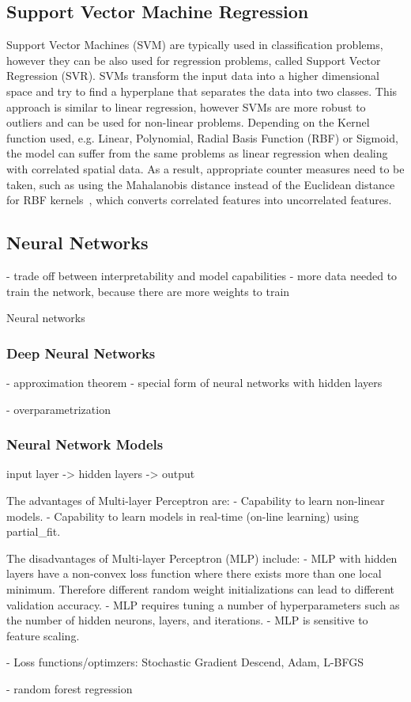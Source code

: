 \subsection{Support Vector Machine Regression}

Support Vector Machines (SVM) are typically used in classification problems, however they can be also used for regression problems, called Support Vector Regression (SVR). SVMs transform the input data into a higher dimensional space and try to find a hyperplane that separates the data into two classes. This approach is similar to linear regression, however SVMs are more robust to outliers and can be used for non-linear problems. Depending on the Kernel function used, e.g. Linear, Polynomial, Radial Basis Function (RBF) or Sigmoid, the model can suffer from the same problems as linear regression when dealing with correlated spatial data.
As a result, appropriate counter measures need to be taken, such as using the Mahalanobis distance instead of the Euclidean distance for RBF kernels~\cite{kamada2006support}, which converts correlated features into uncorrelated features.

\subsection{Neural Networks}

- trade off between interpretability and model capabilities
- more data needed to train the network, because there are more weights to train

Neural networks 

\subsubsection{Deep Neural Networks}
 
- approximation theorem
- special form of neural networks with hidden layers

- overparametrization




\subsubsection{Neural Network Models}
input layer -> hidden layers -> output

The advantages of Multi-layer Perceptron are:
- Capability to learn non-linear models.
- Capability to learn models in real-time (on-line learning) using partial\_fit.

The disadvantages of Multi-layer Perceptron (MLP) include:
- MLP with hidden layers have a non-convex loss function where there exists more than one local minimum. Therefore different random weight initializations can lead to different validation accuracy.
- MLP requires tuning a number of hyperparameters such as the number of hidden neurons, layers, and iterations.
- MLP is sensitive to feature scaling.

- Loss functions/optimzers: Stochastic Gradient Descend, Adam, L-BFGS


- random forest regression
